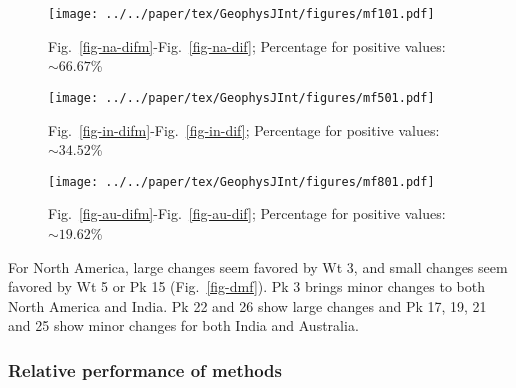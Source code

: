 \begin{figure*}
	\centering
	\begin{subfigure}{1.01\textwidth}
		\texttt{[image: ../../paper/tex/GeophysJInt/figures/mf101.pdf]}
		\caption{Fig.~\ref{fig-na-difm}-Fig.~\ref{fig-na-dif}; Percentage for
		positive values: ${\sim}66.67$\%}\label{fig-mf101}
	\end{subfigure}
	\vspace{.1em}
	\begin{subfigure}{1.01\textwidth}
		\texttt{[image: ../../paper/tex/GeophysJInt/figures/mf501.pdf]}
		\caption{Fig.~\ref{fig-in-difm}-Fig.~\ref{fig-in-dif}; Percentage for
		positive values: ${\sim}34.52$\%}\label{fig-mf501}
	\end{subfigure}
	\vspace{.1em}
	\begin{subfigure}{1.01\textwidth}
		\texttt{[image: ../../paper/tex/GeophysJInt/figures/mf801.pdf]}
		\caption{Fig.~\ref{fig-au-difm}-Fig.~\ref{fig-au-dif}; Percentage for
		positive values: ${\sim}19.62$\%}\label{fig-mf801}
	\end{subfigure}
	\caption[Differences between results from FHM and MHM]{Differences between
results from two different reference paths, FHM (Fig.~\ref{fig-dif}) and MHM
(Fig.~\ref{fig-difm}) derived. The absolute difference values less than
1.96-standard-deviation interval of the whole 168 values are labeled in green,
more than 1.96-standard-deviation interval labeled in red.}\label{fig-dmf}
\end{figure*}

For North America, large changes seem favored by Wt 3, and small changes seem
favored by Wt 5 or Pk 15 (Fig.~\ref{fig-dmf}). Pk 3 brings minor changes to both
North America and India. Pk 22 and 26 show large changes and Pk 17, 19, 21 and
25 show minor changes for both India and Australia.

\subsubsection{Relative performance of methods}

